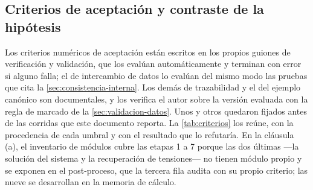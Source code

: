 \subsection{Criterios de aceptación y contraste de la hipótesis}
\label{sec:validacion-resultados}

Los criterios numéricos de aceptación están escritos en los propios guiones de verificación y validación, que los evalúan automáticamente y terminan con error si alguno falla; el de intercambio de datos lo evalúan del mismo modo las pruebas que cita la \autoref{sec:consistencia-interna}. Los demás de trazabilidad y el del ejemplo canónico son documentales, y los verifica el autor sobre la versión evaluada con la regla de marcado de la \autoref{sec:validacion-datos}. Unos y otros quedaron fijados antes de las corridas que este documento reporta. La \autoref{tab:criterios} los reúne, con la procedencia de cada umbral y con el resultado que lo refutaría. En la cláusula (a), el inventario de módulos cubre las etapas 1 a 7 porque las dos últimas ---la solución del sistema y la recuperación de tensiones--- no tienen módulo propio y se exponen en el post-proceso, que la tercera fila audita con su propio criterio; las nueve se desarrollan en la memoria de cálculo.

